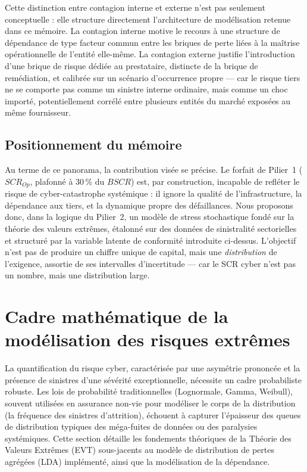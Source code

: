 \documentclass[11pt,a4paper]{article}
\theoremstyle{navystyle}
\theoremstyle{navydef}
\begin{document}
Cette distinction entre contagion interne et externe n'est pas seulement
conceptuelle : elle structure directement l'architecture de modélisation
retenue dans ce mémoire. La contagion interne motive le recours à une
structure de dépendance de type facteur commun entre les briques de perte
liées à la maîtrise opérationnelle de l'entité elle-même. La contagion
externe justifie l'introduction d'une brique de risque dédiée au prestataire,
distincte de la brique de remédiation, et calibrée sur un scénario
d'occurrence propre --- car le risque tiers ne se comporte pas comme un
sinistre interne ordinaire, mais comme un choc importé, potentiellement
corrélé entre plusieurs entités du marché exposées au même fournisseur.

\subsection*{Positionnement du mémoire}

Au terme de ce panorama, la contribution visée se précise. Le forfait de Pilier~1
($SCR_{Op}$, plafonné à $30\,\%$ du $BSCR$) est, par construction, incapable de refléter
le risque de cyber-catastrophe systémique : il ignore la qualité de l'infrastructure, la
dépendance aux tiers, et la dynamique propre des défaillances. Nous proposons donc, dans
la logique du Pilier~2, un modèle de stress stochastique fondé sur la théorie des valeurs
extrêmes, étalonné sur des données de sinistralité sectorielles et structuré par la
variable latente de conformité introduite ci-dessus. L'objectif n'est pas de produire un
chiffre unique de capital, mais une \emph{distribution} de l'exigence, assortie de ses
intervalles d'incertitude --- car le SCR cyber n'est pas un nombre, mais une distribution
large.

\section*{Cadre mathématique de la modélisation des risques extrêmes}

La quantification du risque cyber, caractérisée par une asymétrie prononcée et la présence de sinistres d'une sévérité exceptionnelle, nécessite un cadre probabiliste robuste. Les lois de probabilité traditionnelles (Lognormale, Gamma, Weibull), souvent utilisées en assurance non-vie pour modéliser le corps de la distribution (la fréquence des sinistres d'attrition), échouent à capturer l'épaisseur des queues de distribution typiques des méga-fuites de données ou des paralysies systémiques. Cette section détaille les fondements théoriques de la Théorie des Valeurs Extrêmes (EVT) sous-jacents au modèle de distribution de pertes agrégées (LDA) implémenté, ainsi que la modélisation de la dépendance.
\end{document}
